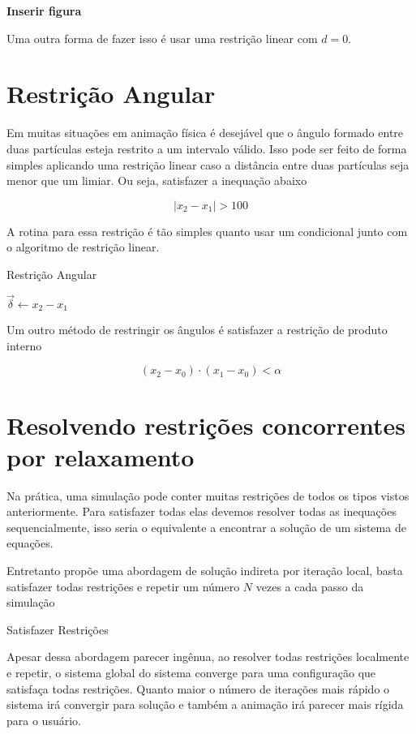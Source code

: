 \textbf{Inserir figura}

Uma outra forma de fazer isso é usar uma restrição linear com $d=0$.

\section{Restrição Angular}

Em muitas situações em animação física é desejável que o ângulo formado entre duas partículas esteja restrito a um intervalo válido. Isso pode ser feito de forma simples aplicando uma restrição linear caso a distância entre duas partículas seja menor que um limiar. Ou seja, satisfazer a inequação abaixo

$$|x_2 - x_1| > 100$$

A rotina para essa restrição é tão simples quanto usar um condicional junto com o algoritmo de restrição linear.

\begin{algorithm}
	\caption{Restrição Angular}
	$\vec{\delta} \leftarrow x_2 - x_1$ \\
\end{algorithm}

Um outro método de restringir os ângulos é satisfazer a restrição de produto interno

$$(x_2-x_0) \cdot (x_1 - x_0) < \alpha$$


\section{Resolvendo restrições concorrentes por relaxamento}

Na prática, uma simulação pode conter muitas restrições de todos os tipos vistos anteriormente. Para satisfazer todas elas devemos resolver todas as inequações sequencialmente, isso seria o equivalente a encontrar a solução de um sistema de equações.

Entretanto  propõe uma abordagem de solução indireta por iteração local, basta satisfazer todas restrições e repetir um número $N$ vezes a cada passo da simulação

\begin{algorithm}
	\caption{Satisfazer Restrições}
	\label{al:satisfazer_restricoes}
\end{algorithm}

Apesar dessa abordagem parecer ingênua, ao resolver todas restrições localmente e repetir, o sistema global do sistema converge para uma configuração que satisfaça todas restrições. Quanto maior o número de iterações mais rápido o sistema irá convergir para solução e também a animação irá parecer mais rígida para o usuário.
